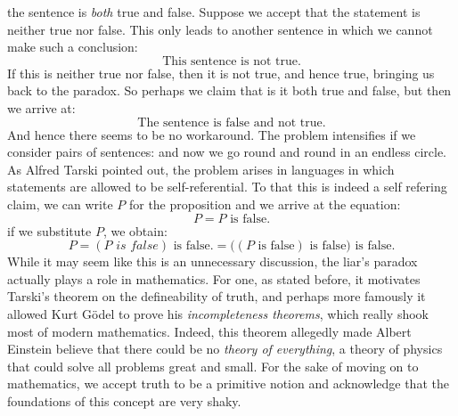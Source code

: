         the sentence is \textit{both} true and false. Suppose we accept that the
        statement is neither true nor false. This only leads to another
        sentence in which we cannot make such a conclusion:
        \begin{equation}
            \text{This sentence is not true.}
        \end{equation}
        If this is neither true nor false, then it is not true, and hence true,
        bringing us back to the paradox. So perhaps we claim that is it both
        true and false, but then we arrive at:
        \begin{equation}
            \text{The sentence is false and not true.}
        \end{equation}
        And hence there seems to be no workaround. The problem intensifies if we
        consider pairs of sentences:
        {%
            \label{eqn:That_Statement_Is_False}%
        }
        and now we go round and round in an endless circle. As Alfred Tarski
        pointed out, the problem arises in languages in which statements are
        allowed to be self-referential. To that this is indeed a self refering
        claim, we can write $P$ for the proposition and we arrive at the
        equation:
        \begin{equation}
            P=P\text{ is false.}
        \end{equation}
        if we substitute $P$, we obtain:
        \begin{equation}
            P=(P\textit{ is false})\text{ is false.}
             =\big((P\text{ is false})\text{ is false}\big)\text{ is false.}
        \end{equation}
        While it may seem like this is an unnecessary discussion, the liar's
        paradox actually plays a role in mathematics. For one, as stated before,
        it motivates Tarski's theorem on the defineability of truth, and perhaps
        more famously it allowed Kurt G\"{o}del to prove
        his \textit{incompleteness theorems}, which really shook most of modern
        mathematics. Indeed, this theorem allegedly made Albert
        Einstein believe that there could be no
        \textit{theory of everything}, a theory of
        physics that could solve all problems great and small. For the sake of
        moving on to mathematics, we accept truth to be a primitive notion and
        acknowledge that the foundations of this concept are very shaky.
